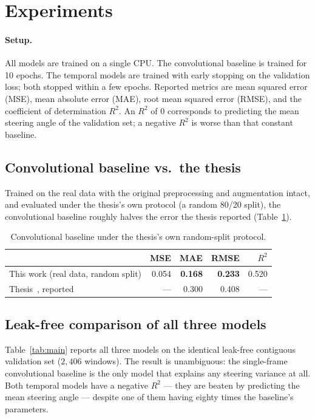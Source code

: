 \documentclass[11pt]{article}
\begin{document}
\section{Experiments}

\paragraph{Setup.}
All models are trained on a single CPU. The convolutional baseline is trained for 10
epochs. The temporal models are trained with early stopping on the validation loss;
both stopped within a few epochs. Reported metrics are mean squared error (MSE),
mean absolute error (MAE), root mean squared error (RMSE), and the coefficient of
determination $R^2$. An $R^2$ of $0$ corresponds to predicting the mean steering
angle of the validation set; a negative $R^2$ is worse than that constant baseline.

\subsection{Convolutional baseline vs.\ the thesis}

Trained on the real data with the original preprocessing and augmentation intact,
and evaluated under the thesis's own protocol (a random 80/20 split), the
convolutional baseline roughly halves the error the thesis reported
(Table~\ref{tab:repro}).

\begin{table}[h]
\centering
\caption{Convolutional baseline under the thesis's own random-split protocol.}
\label{tab:repro}
\begin{tabular}{lrrrr}
\toprule
 & MSE & MAE & RMSE & $R^2$ \\
\midrule
This work (real data, random split) & 0.054 & \textbf{0.168} & \textbf{0.233} & 0.520 \\
Thesis~\mbox{\citep{elgemei2023behavioral}}, reported & --- & 0.300 & 0.408 & --- \\
\bottomrule
\end{tabular}
\end{table}

\subsection{Leak-free comparison of all three models}

Table~\ref{tab:main} reports all three models on the identical leak-free contiguous
validation set ($2{,}406$ windows). The result is unambiguous: the single-frame
convolutional baseline is the only model that explains any steering variance at all.
Both temporal models have a negative $R^2$ --- they are beaten by predicting the
mean steering angle --- despite one of them having eighty times the baseline's
parameters.
\end{document}
